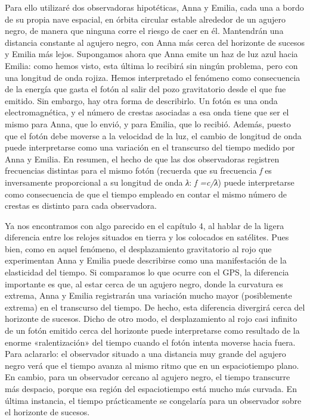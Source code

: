 Para ello utilizaré dos observadoras hipotéticas, Anna y Emilia, cada una a bordo de su propia nave espacial, en órbita circular estable alrededor de un agujero negro, de manera que ninguna corre el riesgo de caer en él. Mantendrán una distancia constante al agujero negro, con Anna más cerca del horizonte de sucesos y Emilia más lejos. Supongamos ahora que Anna emite un haz de luz azul hacia Emilia: como hemos visto, esta última lo recibirá sin ningún problema, pero con una longitud de onda rojiza. Hemos interpretado el fenómeno como consecuencia de la energía que gasta el fotón al salir del pozo gravitatorio desde el que fue emitido. Sin embargo, hay otra forma de describirlo. Un fotón es una onda electromagnética, y el número de crestas asociadas a esa onda tiene que ser el mismo para Anna, que lo envió, y para Emilia, que lo recibió. Además, puesto que el fotón debe moverse a la velocidad de la luz, el cambio de longitud de onda puede interpretarse como una variación en el transcurso del tiempo medido por Anna y Emilia. En resumen, el hecho de que las dos observadoras registren frecuencias distintas para el mismo fotón (recuerda que su frecuencia \emph{f} es inversamente proporcional a su longitud de onda \emph{λ}: \emph{f =c/λ}) puede interpretarse como consecuencia de que el tiempo empleado en contar el mismo número de crestas es distinto para cada observadora.

Ya nos encontramos con algo parecido en el capítulo 4, al hablar de la ligera diferencia entre los relojes situados en tierra y los colocados en satélites. Pues bien, como en aquel fenómeno, el desplazamiento gravitatorio al rojo que experimentan Anna y Emilia puede describirse como una manifestación de la elasticidad del tiempo. Si comparamos lo que ocurre con el GPS, la diferencia importante es que, al estar cerca de un agujero negro, donde la curvatura es extrema, Anna y Emilia registrarán una variación mucho mayor (posiblemente extrema) en el transcurso del tiempo. De hecho, esta diferencia divergirá cerca del horizonte de sucesos. Dicho de otro modo, el desplazamiento al rojo casi infinito de un fotón emitido cerca del horizonte puede interpretarse como resultado de la enorme «ralentización» del tiempo cuando el fotón intenta moverse hacia fuera. Para aclararlo: el observador situado a una distancia muy grande del agujero negro verá que el tiempo avanza al mismo ritmo que en un espaciotiempo plano. En cambio, para un observador cercano al agujero negro, el tiempo transcurre más despacio, porque esa región del espaciotiempo está mucho más curvada. En última instancia, el tiempo prácticamente se congelaría para un observador sobre el horizonte de sucesos.

